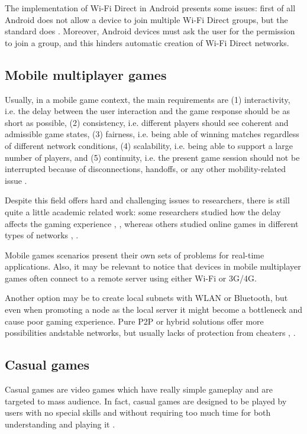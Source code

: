 The implementation of Wi-Fi Direct in Android presents some issues: first of all
Android does not allow a device to join multiple Wi-Fi Direct groups,
but the standard does \cite{bib:android-wifidirect-limits}. Moreover, Android 
devices must ask the user for the permission to join a group, and this hinders 
automatic creation of Wi-Fi Direct networks.

\subsection{Mobile multiplayer games}
Usually, in a mobile game context, the main requirements are (1)
interactivity, i.e. the delay between the user interaction and the game
response should be as short as possible, (2) consistency, i.e. different
players should see coherent and admissible game states, (3) fairness, i.e.
being able of winning matches regardless of different network conditions, (4)
scalability, i.e. being able to support a large number of players, and (5)
continuity, i.e. the present game session should not be interrupted because
of disconnections, handoffs, or any other mobility-related issue
\cite{bib:interactive-mobile-gaming}.

Despite this field offers hard and challenging issues to researchers, there is
still quite a little academic related work: some researchers studied how
the delay affects the gaming experience \cite{bib:impact-delay-multi},
\cite{bib:factors-multi}, whereas others studied online games in different
types of networks \cite{bib:interactive-mobile-gaming},
\cite{bib:survey-mobile-games}.

Mobile games scenarios present their own sets of problems for real-time
applications. Also, it may be relevant to notice that devices in mobile
multiplayer games often connect to a remote server using either Wi-Fi or 3G/4G.

Another option may be to create local subnets with WLAN or Bluetooth, but
even when promoting a node as the local server it might become a
bottleneck and cause poor gaming experience.
Pure P2P or hybrid solutions offer more possibilities andstable networks, 
but usually lacks of protection from cheaters
\cite{bib:can-mobile-gaming-be-improved}, \cite{bib:study-mobile-phone-sector}.

\subsection{Casual games}
Casual games are video games which have really simple gameplay and are
targeted to mass audience. In fact, casual games are designed to be played
by users with no special skills and without requiring too much time for both
understanding and playing it \cite{bib:mob-health-casual}.

